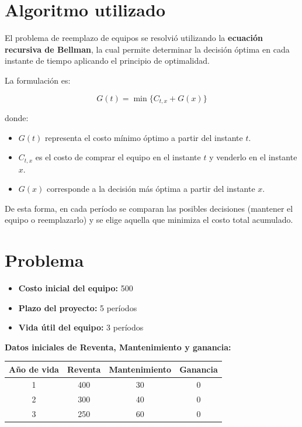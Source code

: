 \documentclass[12pt]{article}
\begin{document}
\bigskip
\section*{Algoritmo utilizado}
El problema de reemplazo de equipos se resolvió utilizando la \textbf{ecuación recursiva de Bellman}, la cual permite determinar la decisión óptima en cada instante de tiempo aplicando el principio de optimalidad. 

La formulación es:

$$
G(t) = \min \{ C_{t,x} + G(x) \}
$$

donde:
\begin{itemize}
  \item $G(t)$ representa el costo mínimo óptimo a partir del instante $t$.
  \item $C_{t,x}$ es el costo de comprar el equipo en el instante $t$ y venderlo en el instante $x$.
  \item $G(x)$ corresponde a la decisión más óptima a partir del instante $x$.
\end{itemize}

De esta forma, en cada período se comparan las posibles decisiones (mantener el equipo o reemplazarlo) y se elige aquella que minimiza el costo total acumulado.

\bigskip
\section*{Problema}
\begin{itemize}
\item \textbf{Costo inicial del equipo:} 500
\item \textbf{Plazo del proyecto:} 5 períodos
\item \textbf{Vida útil del equipo:} 3 períodos
\end{itemize}

\textbf{Datos iniciales de Reventa, Mantenimiento y ganancia:} 
\begin{table}[h!]
\centering
\begin{tabular}{|c|c|c|c|}
\hline
\textbf{Año de vida} & \textbf{Reventa} & \textbf{Mantenimiento} & \textbf{Ganancia} \\
\hline
1 & 400 & 30 & 0 \\
\hline
2 & 300 & 40 & 0 \\
\hline
3 & 250 & 60 & 0 \\
\hline
\end{tabular}
\end{table}
\end{document}
